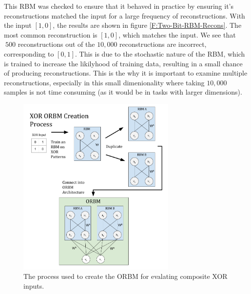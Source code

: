 This RBM was checked to ensure that it behaved in practice by ensuring it's reconstructions matched the input for a large frequency of reconstructions. With the input $[1,0]$, the results are shown in figure \ref{F:Two-Bit-RBM-Recons}. The most common reconstruction is  $[1,0]$, which matches the input. We see that $~500$ reconstructions out of the $10,000$ reconstructions are incorrect, corresponding to $[0,1]$. This is due to the stochastic nature of the RBM, which is trained to increase the likilyhood of training data, resulting in a small chance of producing reconstructions. This is the why it is important to examine multiple reconstructions, especially in this small dimenionality where taking $10,000$ samples is not time consuming (as it would be in tasks with larger dimensions).
\begin{figure}[!htb]
  \begin{center}
    \includegraphics[width=0.7\textwidth]{Assets/XOR-ORBM-Creation-Process.png}
  \end{center}
  \caption{The process used to create the ORBM for evalating composite XOR inputs.}
  \label{F:XOR-ORBM-Creation-Process-Diagram}
\end{figure}

